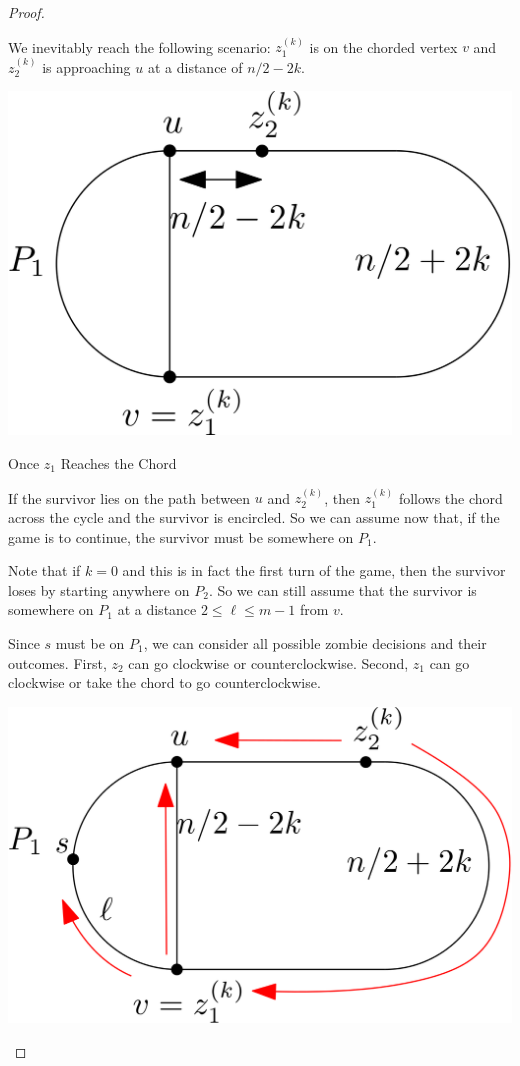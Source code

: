 \documentclass[letterpaper, 10pt]{article}
\begin{document}
\begin{proof}
\begin{proofpart}
We inevitably reach the following scenario: $z_1^{(k)}$ is on the chorded vertex $v$
and $z_2^{(k)}$ is approaching $u$ at a distance of $n/2 -2k$.

\begin{center}
\includegraphics[scale=0.15]{diagram5}
\end{center}

\end{proofpart}

\begin{proofpart} Once $z_1$ Reaches the Chord

If the survivor lies on the path between $u$ and $z_2^{(k)}$, then
$z_1^{(k)}$ follows the chord across the cycle and the survivor is encircled.
So we can assume now that, if the game is to continue, the survivor must be
somewhere on $P_1$.

Note that if $k=0$ and this is in fact the first turn of the game, then
the survivor loses by starting anywhere on $P_2$. So we can still assume
that the survivor is somewhere on $P_1$ at a distance $2 \leq \ell \leq m-1$ from $v$.

Since $s$ must be on $P_1$, we can consider all possible zombie decisions and their outcomes.
First, $z_2$ can go clockwise or counterclockwise.
Second, $z_1$ can go clockwise or take the chord to go counterclockwise.

\begin{center}
\includegraphics[scale=0.15]{diagram6}
\end{center}


\end{proofpart}
\end{proof}
\end{document}
